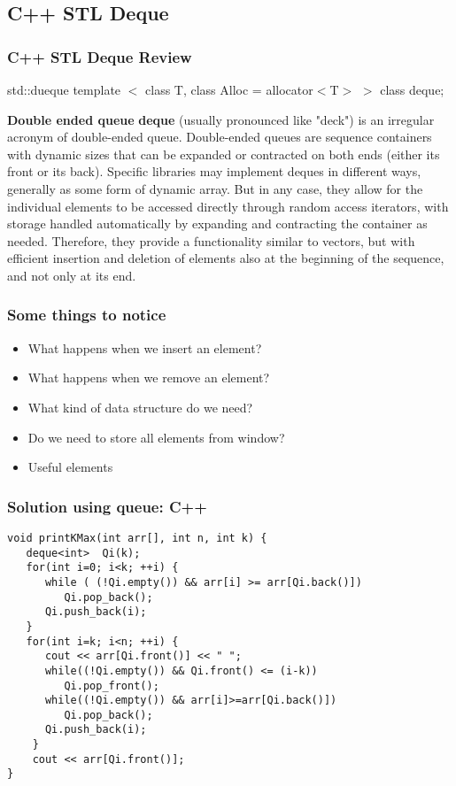 \documentclass{beamer}
\begin{document}
\subsection{C++ STL Deque} 
\begin{frame}
\frametitle{C++ STL Deque Review}
\begin{block}{std::dueque}
template $<$ class T, class Alloc = allocator$<$T$>$ $>$ class deque;
\end{block}


\begin{block}{\textbf{Double ended queue}}
\textbf{deque} (usually pronounced like "deck") is an irregular acronym of double-ended queue. Double-ended queues are sequence containers with dynamic sizes that can be expanded or contracted on both ends (either its front or its back).
Specific libraries may implement deques in different ways, generally as some form of dynamic array. But in any case, they allow for the individual elements to be accessed directly through random access iterators, with storage handled automatically by expanding and contracting the container as needed.
Therefore, they provide a functionality similar to vectors, but with efficient insertion and deletion of elements also at the beginning of the sequence, and not only at its end. 
\end{block}
\end{frame}
\begin{frame}
\frametitle{ Some things to notice }
\begin{itemize}
	\item What happens when we insert an element?
	\item What happens when we remove an element?
	\item What kind of data structure do we need?
	\item Do we need to store all elements from window?
		\item Useful elements
\end{itemize}
\end{frame}
\begin{frame}[fragile]
\frametitle{ Solution using queue: C++ }
\begin{example}[ C++ Implementation ]
\begin{lstlisting}
void printKMax(int arr[], int n, int k) {
   deque<int>  Qi(k);
   for(int i=0; i<k; ++i) {
      while ( (!Qi.empty()) && arr[i] >= arr[Qi.back()])
         Qi.pop_back();
      Qi.push_back(i);
   }
   for(int i=k; i<n; ++i) {
      cout << arr[Qi.front()] << " ";
      while((!Qi.empty()) && Qi.front() <= (i-k))
         Qi.pop_front();
      while((!Qi.empty()) && arr[i]>=arr[Qi.back()])
         Qi.pop_back();
      Qi.push_back(i);
    }
    cout << arr[Qi.front()];
}
\end{lstlisting}
\end{example}
\end{frame}
\end{document}
